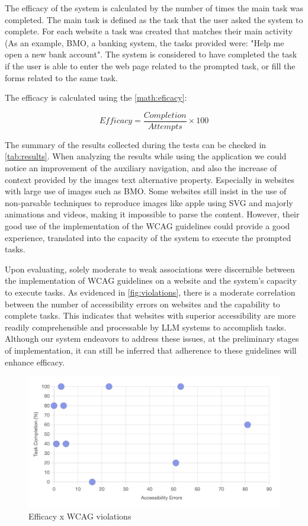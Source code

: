 \documentclass[conference]{IEEEtran}
\begin{document}
The efficacy of the system is calculated by the number of times the main task was completed. The main task is defined as the task that the user asked the system to complete. For each website a task was created that matches their main activity (As an example, BMO, a banking system, the tasks provided were: "Help me open a new bank account". The system is considered to have completed the task if the user is able to enter the web page related to the prompted task, or fill the forms related to the same task.

The efficacy is calculated using the \autoref{math:eficacy}:

\begin{equation}
    \label{math:eficacy}
    Efficacy = \frac{Completion}{Attempts}\times 100
\end{equation}

The summary of the results collected during the tests can be checked in \autoref{tab:results}. When analyzing the results while using the application we could notice an improvement of the auxiliary navigation, and also the increase of context provided by the images text alternative property. Especially in websites with large use of images such as BMO. Some websites still insist in the use of non-parsable techniques to reproduce images like apple using SVG and majorly animations and videos, making it impossible to parse the content. However, their good use of the implementation of the WCAG guidelines could provide a good experience, translated into the capacity of the system to execute the prompted tasks.

Upon evaluating, solely moderate to weak associations were discernible between the implementation of WCAG guidelines on a website and the system's capacity to execute tasks. As evidenced in \autoref{fig:violations}, there is a moderate correlation between the number of accessibility errors on websites and the capability to complete tasks. This indicates that websites with superior accessibility are more readily comprehensible and processable by LLM systems to accomplish tasks. Although our system endeavors to address these issues, at the preliminary stages of implementation, it can still be inferred that adherence to these guidelines will enhance efficacy.

\begin{figure}[h]
    \centering
    \includegraphics[width=1\linewidth]{images/eficiencexerrors.png}
    \caption{Efficacy x WCAG violations}
    \label{fig:violations}
\end{figure}
\end{document}
